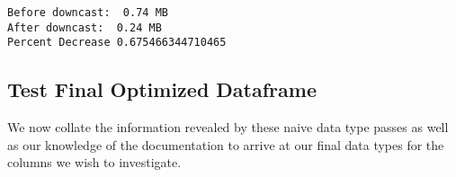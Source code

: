 \documentclass[11pt]{article}
\begin{document}
    \begin{Verbatim}[commandchars=\\\{\}]
Before downcast:  0.74 MB
After downcast:  0.24 MB
Percent Decrease 0.675466344710465

    \end{Verbatim}

    \subsection{Test Final Optimized
Dataframe}\label{test-final-optimized-dataframe}

    We now collate the information revealed by these naive data type passes
as well as our knowledge of the documentation to arrive at our final
data types for the columns we wish to investigate.
\end{document}
